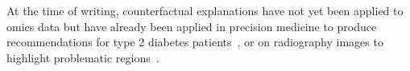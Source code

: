 \documentclass[../main.tex]{subfiles}
\begin{document}
	At the time of writing, counterfactual explanations have not yet been applied to omics data but have already been applied in precision medicine to produce recommendations for type 2 diabetes patients~\cite{Lenatti2022}, or on radiography images to highlight problematic regions~\cite{Thiagarajan2022,Mertes2022}.

\end{document}

